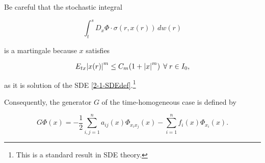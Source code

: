 \begin{remark}
    Be careful that the stochastic integral

    \[\int_t^s D_x\Phi\cdot\sigma(r,x(r))\,dw(r)\]

    is a martingale because $x$ satisfies

    \[E_{tx}\abs{x(r)}^m\leq C_m(1+\abs{x}^m)\,\forall r\in I_0,\]

    as it is solution of the SDE \ref{2-1-SDEdef}.\footnote{This is a standard result in SDE theory.}
\end{remark}

Consequently, the generator $G$ of the time-homogeneous case is defined by

\begin{equation}
    G\Phi(x) = -\frac{1}{2}\sum_{i,j=1}^n a_{ij}(x)\Phi_{x_ix_j}(x) - \sum_{i=1}^n f_i(x)\Phi_{x_i}(x).
\end{equation}